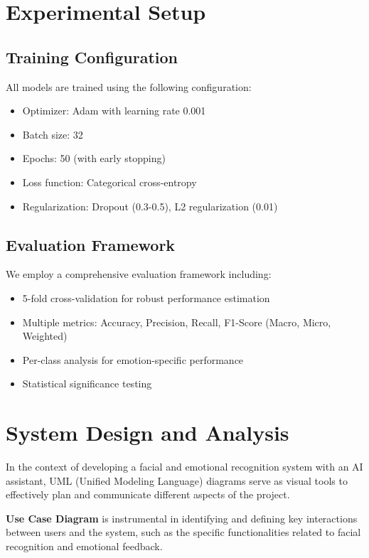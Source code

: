 \documentclass[conference]{IEEEtran}
\begin{document}
\section{Experimental Setup}

\subsection{Training Configuration}
All models are trained using the following configuration:
\begin{itemize}
    \item Optimizer: Adam with learning rate 0.001
    \item Batch size: 32
    \item Epochs: 50 (with early stopping)
    \item Loss function: Categorical cross-entropy
    \item Regularization: Dropout (0.3-0.5), L2 regularization (0.01)
\end{itemize}

\subsection{Evaluation Framework}
We employ a comprehensive evaluation framework including:
\begin{itemize}
    \item 5-fold cross-validation for robust performance estimation
    \item Multiple metrics: Accuracy, Precision, Recall, F1-Score (Macro, Micro, Weighted)
    \item Per-class analysis for emotion-specific performance
    \item Statistical significance testing
\end{itemize}

\section{System Design and Analysis}

In the context of developing a facial and emotional recognition system with an AI assistant, UML (Unified Modeling Language) diagrams serve as visual tools to effectively plan and communicate different aspects of the project.

\textbf{Use Case Diagram} is instrumental in identifying and defining key interactions between users and the system, such as the specific functionalities related to facial recognition and emotional feedback.
\end{document}
